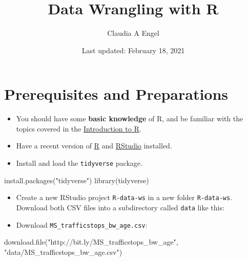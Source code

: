 \documentclass[
]{book}
\title{Data Wrangling with R}
\author{Claudia A Engel}
\date{Last updated: February 18, 2021}
\newenvironment{Shaded}{\begin{snugshade}}{\end{snugshade}}
\newcommand{\FunctionTok}[1]{\textcolor[rgb]{0.00,0.00,0.00}{#1}}
\newcommand{\NormalTok}[1]{#1}
\newcommand{\StringTok}[1]{\textcolor[rgb]{0.31,0.60,0.02}{#1}}
\providecommand{\tightlist}{%
  \setlength{\itemsep}{0pt}\setlength{\parskip}{0pt}}
\begin{document}
\maketitle

{
\setcounter{tocdepth}{1}
\tableofcontents
}
\hypertarget{prerequisites-and-preparations}{%
\chapter*{Prerequisites and Preparations}\label{prerequisites-and-preparations}}

\begin{itemize}
\tightlist
\item
  You should have some \textbf{basic knowledge} of R, and be familiar with the topics covered in the \href{https://cengel.github.io/R-intro/}{Introduction to R}.
\item
  Have a recent version of \href{https://cran.r-project.org/}{R} and \href{https://www.rstudio.com/}{RStudio} installed.
\item
  Install and load the \texttt{tidyverse} package.
\end{itemize}

\begin{Shaded}
\begin{Highlighting}[]
\FunctionTok{install.packages}\NormalTok{(}\StringTok{"tidyverse"}\NormalTok{)  }
\FunctionTok{library}\NormalTok{(tidyverse)}
\end{Highlighting}
\end{Shaded}

\begin{itemize}
\tightlist
\item
  Create a new RStudio project \texttt{R-data-ws} in a new folder \texttt{R-data-ws}. Download both CSV files into a subdirectory called \texttt{data} like this:
\item
  Download \texttt{MS\_trafficstops\_bw\_age.csv}:
\end{itemize}

\begin{Shaded}
\begin{Highlighting}[]
\FunctionTok{download.file}\NormalTok{(}\StringTok{"http://bit.ly/MS\_trafficstops\_bw\_age"}\NormalTok{,}
              \StringTok{"data/MS\_trafficstops\_bw\_age.csv"}\NormalTok{)}
\end{Highlighting}
\end{Shaded}
\end{document}
